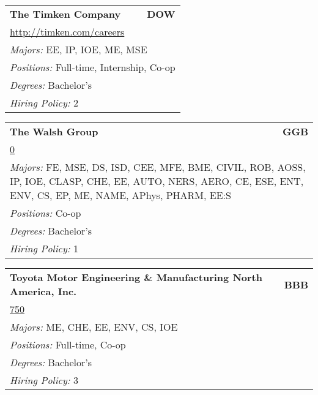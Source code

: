 \documentclass[twoside]{article}
\begin{document}
\begin{center}
\begin{multicols}{3}
\begin{FlushLeft}
\begin{minipage}{\columnwidth}
\end{minipage}
 
\begin{minipage}{\columnwidth}\begin{tabularx}{.95\columnwidth}{Xr}
                 {\Large\bf The Timken Company} & {\Large\bf DOW}\\
    \multicolumn{2}{p{.95\columnwidth}}{\url{http://timken.com/careers}}\\
    \multicolumn{2}{p{.95\columnwidth}}{\emph{Majors:} EE, IP, IOE, ME, MSE}\\
    \multicolumn{2}{p{.95\columnwidth}}{\emph{Positions:} Full-time, Internship, Co-op}\\
    \multicolumn{2}{p{.95\columnwidth}}{\emph{Degrees:} Bachelor's}\\
    \multicolumn{2}{p{.95\columnwidth}}{\emph{Hiring Policy:} 2}\\
    \end{tabularx}
    
\end{minipage}
 
\begin{minipage}{\columnwidth}\begin{tabularx}{.95\columnwidth}{Xr}
                 {\Large\bf The Walsh Group} & {\Large\bf GGB}\\
    \multicolumn{2}{p{.95\columnwidth}}{\url{0}}\\
    \multicolumn{2}{p{.95\columnwidth}}{\emph{Majors:} FE, MSE, DS, ISD, CEE, MFE, BME, CIVIL, ROB, AOSS, IP, IOE, CLASP, CHE, EE, AUTO, NERS, AERO, CE, ESE, ENT, ENV, CS, EP, ME, NAME, APhys, PHARM, EE:S}\\
    \multicolumn{2}{p{.95\columnwidth}}{\emph{Positions:} Co-op}\\
    \multicolumn{2}{p{.95\columnwidth}}{\emph{Degrees:} Bachelor's}\\
    \multicolumn{2}{p{.95\columnwidth}}{\emph{Hiring Policy:} 1}\\
    \end{tabularx}
    
\end{minipage}
 
\begin{minipage}{\columnwidth}\begin{tabularx}{.95\columnwidth}{Xr}
                 {\Large\bf Toyota Motor Engineering \& Manufacturing North America, Inc.} & {\Large\bf BBB}\\
    \multicolumn{2}{p{.95\columnwidth}}{\url{750}}\\
    \multicolumn{2}{p{.95\columnwidth}}{\emph{Majors:} ME, CHE, EE, ENV, CS, IOE}\\
    \multicolumn{2}{p{.95\columnwidth}}{\emph{Positions:} Full-time, Co-op}\\
    \multicolumn{2}{p{.95\columnwidth}}{\emph{Degrees:} Bachelor's}\\
    \multicolumn{2}{p{.95\columnwidth}}{\emph{Hiring Policy:} 3}\\
    \end{tabularx}
    

\end{minipage}
\end{FlushLeft}
\end{multicols}
\end{center}
\end{document}
